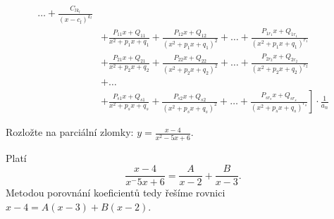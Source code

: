 \begin{veta}
\begin{align*}
              \dots + \frac{C_{lk_l}}{(x-c_l)^{k_l}} \\
          & + \frac{P_{11}x + Q_{11}}{x^2 + p_1x + q_1}
              + \frac{P_{12}x + Q_{12}}{(x^2 + p_1x + q_1)^2} + \dots
              + \frac{P_{1r_1}x + Q_{1r_1}}{(x^2 + p_1x + q_1)^{r_1}} \\
          & + \frac{P_{21}x + Q_{21}}{x^2 + p_2x + q_2}
              + \frac{P_{22}x + Q_{22}}{(x^2 + p_2x + q_2)^2} + \dots
              + \frac{P_{2r_2}x + Q_{2r_2}}{(x^2 + p_2x + q_2)^{r_2}} \\
          & + \dots \\
          & + \left . \frac{P_{s1}x + Q_{s1}}{x^2 + p_sx + q_s}
              + \frac{P_{s2}x + Q_{s2}}{(x^2 + p_sx + q_s)^2} + \dots
              + \frac{P_{sr_s}x + Q_{sr_s}}{(x^2 + p_sx + q_s)^{r_s}} \right ]
              \cdot \frac{1}{a_n}
    \end{align*}
\end{veta}

\begin{priklad}
Rozložte na parciální zlomky: $y=\frac{x-4}{x^2-5x+6}.$
\end{priklad}

\begin{reseni}
Platí
$$\frac{x-4}{x^-5x+6}=\frac{A}{x-2}+\frac{B}{x-3}.$$
Metodou porovnání koeficientů tedy řešíme rovnici $x-4=A(x-3)+B(x-2)$.
\end{reseni}
